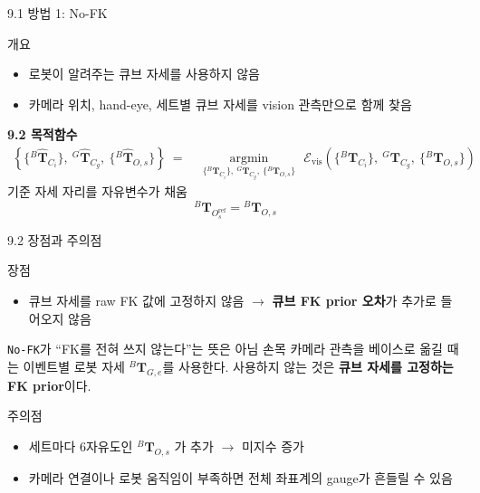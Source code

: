 \documentclass[aspectratio=169,11pt]{beamer}
\newcommand{\T}[3][]{{}^{#2}\mathbf{T}^{#1}_{#3}}   %
\newcommand{\Th}[3][]{{}^{#2}\widehat{\mathbf{T}}^{#1}_{#3}} %
\newcommand{\Oref}{O^{\mathrm{ref}}}   %
\begin{document}
\begin{frame}{9.1 방법 1: No-FK}
  \begin{block}{개요}
    \begin{itemize}
      \item 로봇이 알려주는 큐브 자세를 사용하지 않음
      \item 카메라 위치, hand-eye, 세트별 큐브 자세를 vision 관측만으로 함께 찾음
    \end{itemize}
  \end{block}
  \vfill
  \textbf{9.2 목적함수}
  {\footnotesize
  \[
    \begin{aligned}
      \left\{
        \{\Th{B}{C_i}\},\ \Th{G}{C_g},\ \{\Th{B}{O,s}\}
      \right\}
      \ =\ &
      \underset{
        \{\T{B}{C_i}\},\ \T{G}{C_g},\ \{\T{B}{O,s}\}
      }{\operatorname{argmin}}
      \ \,
      \mathcal{E}_{\mathrm{vis}}
      \left(
        \{\T{B}{C_i}\},\ \T{G}{C_g},\ \{\T{B}{O,s}\}
      \right)
    \end{aligned}
  \]
  }
  \vfill
  기준 자세 자리를 자유변수가 채움
  \[
    \T{B}{\Oref_s}=\T{B}{O,s}
  \]
\end{frame}

\begin{frame}{9.2 장점과 주의점}
  \begin{block}{장점}
    \begin{itemize}
      \item 큐브 자세를 raw FK 값에 고정하지 않음
        $\rightarrow$ \textbf{큐브 FK prior 오차}가 추가로 들어오지 않음
    \end{itemize}
  \end{block}
  \vfill
  \begin{alertblock}{\texttt{No-FK}가 ``FK를 전혀 쓰지 않는다''는 뜻은 아님}
    손목 카메라 관측을 베이스로 옮길 때는 이벤트별 로봇 자세
    $\T{B}{G,e}$를 사용한다. 사용하지 않는 것은
    \textbf{큐브 자세를 고정하는 FK prior}이다.
  \end{alertblock}
  \vfill
  \begin{block}{주의점}
    \begin{itemize}
      \item 세트마다 $6$자유도인 $\T{B}{O,s}$ 가 추가 $\rightarrow$ 미지수 증가
      \item 카메라 연결이나 로봇 움직임이 부족하면 전체 좌표계의 gauge가 흔들릴 수 있음
    \end{itemize}
  \end{block}
\end{frame}
\end{document}
